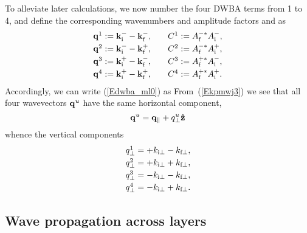 To alleviate later calculations,
we now number the four DWBA terms from 1 to 4,
and define the corresponding wavenumbers and amplitude factors and as
\begin{equation}
  \begin{array}{l@{\hspace{2em}}l}
    \q^1 := \k^-_\ti - \k^-_\tf,& C^1 := A^{-*}_\tf A^-_\ti, \\[.6ex]
    \q^2 := \k^-_\ti - \k^+_\tf,& C^2 := A^{-*}_\tf A^+_\ti, \\[.6ex]
    \q^3 := \k^+_\ti - \k^-_\tf,& C^3 := A^{+*}_\tf A^-_\ti, \\[.6ex]
    \q^4 := \k^+_\ti - \k^+_\tf,& C^4 := A^{+*}_\tf A^+_\ti.
  \end{array}
\end{equation}
Accordingly, we can write (\ref{Edwba_ml0}) as
From~(\ref{Ekpmwj3}) we see that all four wavevectors $\mathbf{q}^u$
have the same horizontal component,
\begin{equation}\label{Eqpp}
  \mathbf{q}^u = \mathbf{q}_\parallel + q^u_\perp \mathbf{\hat z}
\end{equation}
whence the vertical components
\begin{equation}
    \begin{array}{l}
  q^1_\perp = +k_{\text{i}\perp  } -k_{\text{f}\perp},\\[.6ex]
  q^2_\perp = +k_{\text{i}\perp  } +k_{\text{f}\perp},\\[.6ex]
  q^3_\perp = -k_{\text{i}\perp  } -k_{\text{f}\perp},\\[.6ex]
  q^4_\perp = -k_{\text{i}\perp  } +k_{\text{f}\perp}.
    \end{array}
\end{equation}

\subsection{Wave propagation across layers}\label{Sacrolay}

%
%
%

